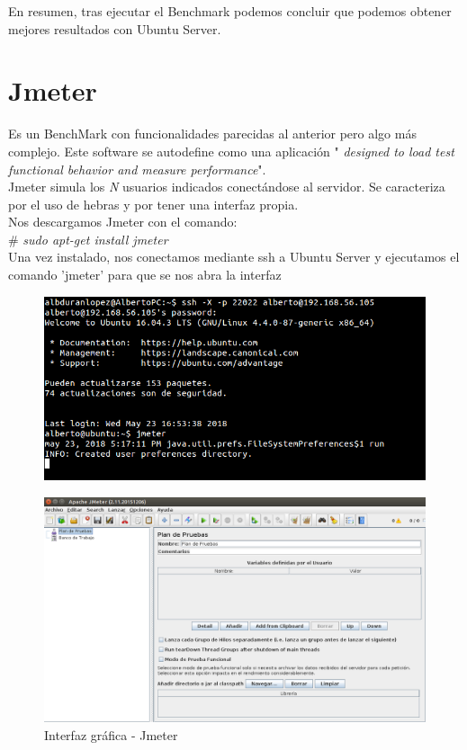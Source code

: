 En resumen, tras ejecutar el Benchmark podemos concluir que podemos obtener mejores resultados con Ubuntu Server.




\newpage
\section{Jmeter}

Es un BenchMark con funcionalidades parecidas al anterior pero algo más complejo. Este software se autodefine como una aplicación 
" \textit{designed to load test functional behavior and measure performance}".\\ Jmeter simula los \textit{N} usuarios indicados conectándose al servidor. Se caracteriza por el uso de hebras y por tener una interfaz propia. \\

Nos descargamos Jmeter con el comando:\\
\# \textit{sudo apt-get install jmeter} \\

Una vez instalado, nos conectamos mediante ssh a Ubuntu Server y ejecutamos el comando 'jmeter' para que se nos abra la interfaz

	\begin{figure}[h]
		\centering
		\includegraphics[scale=0.4]{images/inicioJ.png}
	\end{figure}
	
		\begin{figure}[h]
			\centering
			\includegraphics[scale=0.35]{images/jmeter2.png}
			\caption{Interfaz gráfica - Jmeter}
		\end{figure}
		
